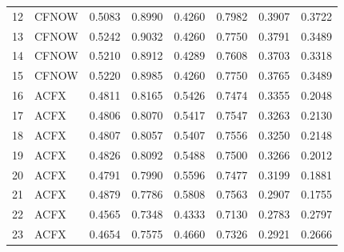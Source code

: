 \begin{tabular}{rlrrrrrr}
    12 &  CFNOW &        0.5083 &                0.8990 &              0.4260 &                 0.7982 &                 0.3907 &                       0.3722 \\
    13 &  CFNOW &        0.5242 &                0.9032 &              0.4260 &                 0.7750 &                 0.3791 &                       0.3489 \\
    14 &  CFNOW &        0.5210 &                0.8912 &              0.4289 &                 0.7608 &                 0.3703 &                       0.3318 \\
    15 &  CFNOW &        0.5220 &                0.8985 &              0.4260 &                 0.7750 &                 0.3765 &                       0.3489 \\
    16 &   ACFX &        0.4811 &                0.8165 &              0.5426 &                 0.7474 &                 0.3355 &                       0.2048 \\
    17 &   ACFX &        0.4806 &                0.8070 &              0.5417 &                 0.7547 &                 0.3263 &                       0.2130 \\
    18 &   ACFX &        0.4807 &                0.8057 &              0.5407 &                 0.7556 &                 0.3250 &                       0.2148 \\
    19 &   ACFX &        0.4826 &                0.8092 &              0.5488 &                 0.7500 &                 0.3266 &                       0.2012 \\
    20 &   ACFX &        0.4791 &                0.7990 &              0.5596 &                 0.7477 &                 0.3199 &                       0.1881 \\
    21 &   ACFX &        0.4879 &                0.7786 &              0.5808 &                 0.7563 &                 0.2907 &                       0.1755 \\
    22 &   ACFX &        0.4565 &                0.7348 &              0.4333 &                 0.7130 &                 0.2783 &                       0.2797 \\
    23 &   ACFX &        0.4654 &                0.7575 &              0.4660 &                 0.7326 &                 0.2921 &                       0.2666 \\
\bottomrule
\end{tabular}
